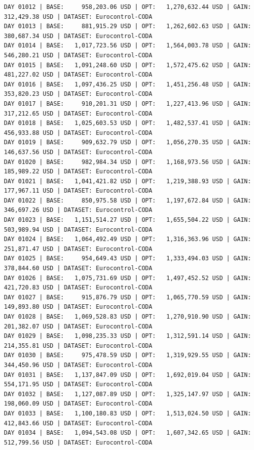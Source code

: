 \documentclass[11pt,a4paper]{article}
\begin{document}
\begin{verbatim}
DAY 01012 | BASE:     958,203.06 USD | OPT:   1,270,632.44 USD | GAIN: 312,429.38 USD | DATASET: Eurocontrol-CODA
DAY 01013 | BASE:     881,915.29 USD | OPT:   1,262,602.63 USD | GAIN: 380,687.34 USD | DATASET: Eurocontrol-CODA
DAY 01014 | BASE:   1,017,723.56 USD | OPT:   1,564,003.78 USD | GAIN: 546,280.21 USD | DATASET: Eurocontrol-CODA
DAY 01015 | BASE:   1,091,248.60 USD | OPT:   1,572,475.62 USD | GAIN: 481,227.02 USD | DATASET: Eurocontrol-CODA
DAY 01016 | BASE:   1,097,436.25 USD | OPT:   1,451,256.48 USD | GAIN: 353,820.23 USD | DATASET: Eurocontrol-CODA
DAY 01017 | BASE:     910,201.31 USD | OPT:   1,227,413.96 USD | GAIN: 317,212.65 USD | DATASET: Eurocontrol-CODA
DAY 01018 | BASE:   1,025,603.53 USD | OPT:   1,482,537.41 USD | GAIN: 456,933.88 USD | DATASET: Eurocontrol-CODA
DAY 01019 | BASE:     909,632.79 USD | OPT:   1,056,270.35 USD | GAIN: 146,637.56 USD | DATASET: Eurocontrol-CODA
DAY 01020 | BASE:     982,984.34 USD | OPT:   1,168,973.56 USD | GAIN: 185,989.22 USD | DATASET: Eurocontrol-CODA
DAY 01021 | BASE:   1,041,421.82 USD | OPT:   1,219,388.93 USD | GAIN: 177,967.11 USD | DATASET: Eurocontrol-CODA
DAY 01022 | BASE:     850,975.58 USD | OPT:   1,197,672.84 USD | GAIN: 346,697.26 USD | DATASET: Eurocontrol-CODA
DAY 01023 | BASE:   1,151,514.27 USD | OPT:   1,655,504.22 USD | GAIN: 503,989.94 USD | DATASET: Eurocontrol-CODA
DAY 01024 | BASE:   1,064,492.49 USD | OPT:   1,316,363.96 USD | GAIN: 251,871.47 USD | DATASET: Eurocontrol-CODA
DAY 01025 | BASE:     954,649.43 USD | OPT:   1,333,494.03 USD | GAIN: 378,844.60 USD | DATASET: Eurocontrol-CODA
DAY 01026 | BASE:   1,075,731.69 USD | OPT:   1,497,452.52 USD | GAIN: 421,720.83 USD | DATASET: Eurocontrol-CODA
DAY 01027 | BASE:     915,876.79 USD | OPT:   1,065,770.59 USD | GAIN: 149,893.80 USD | DATASET: Eurocontrol-CODA
DAY 01028 | BASE:   1,069,528.83 USD | OPT:   1,270,910.90 USD | GAIN: 201,382.07 USD | DATASET: Eurocontrol-CODA
DAY 01029 | BASE:   1,098,235.33 USD | OPT:   1,312,591.14 USD | GAIN: 214,355.81 USD | DATASET: Eurocontrol-CODA
DAY 01030 | BASE:     975,478.59 USD | OPT:   1,319,929.55 USD | GAIN: 344,450.96 USD | DATASET: Eurocontrol-CODA
DAY 01031 | BASE:   1,137,847.09 USD | OPT:   1,692,019.04 USD | GAIN: 554,171.95 USD | DATASET: Eurocontrol-CODA
DAY 01032 | BASE:   1,127,087.89 USD | OPT:   1,325,147.97 USD | GAIN: 198,060.09 USD | DATASET: Eurocontrol-CODA
DAY 01033 | BASE:   1,100,180.83 USD | OPT:   1,513,024.50 USD | GAIN: 412,843.66 USD | DATASET: Eurocontrol-CODA
DAY 01034 | BASE:   1,094,543.08 USD | OPT:   1,607,342.65 USD | GAIN: 512,799.56 USD | DATASET: Eurocontrol-CODA

\end{verbatim}
\end{document}
